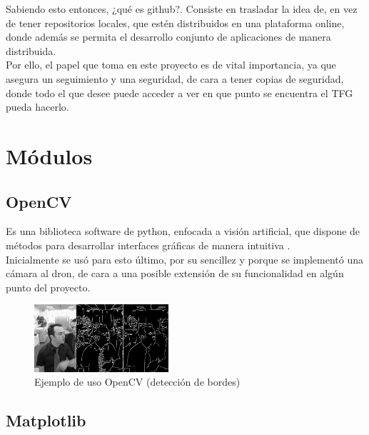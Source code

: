 Sabiendo esto entonces, ¿qué es github?. Consiste en trasladar la idea de, en vez de tener repositorios locales, que estén distribuidos en una plataforma online, donde además se permita el desarrollo conjunto de aplicaciones de manera distribuida.\\

Por ello, el papel que toma en este proyecto es de vital importancia, ya que asegura un seguimiento y una seguridad, de cara a tener copias de seguridad, donde todo el que desee puede acceder a ver en que punto se encuentra el \ac{TFG} pueda hacerlo.\\

\section{Módulos}
\label{sec:modulos}

\subsection{OpenCV}
\label{subsec:opencv}

Es una biblioteca software de python, enfocada a visión artificial, que dispone de métodos para desarrollar interfaces gráficas de manera intuitiva \cite{opencv-def}.\\

Inicialmente se usó para esto último, por su sencillez y porque se implementó una cámara al dron, de cara a una posible extensión de su funcionalidad en algún punto del proyecto.\\

\begin{figure} [H]
	\begin{center}
	\includegraphics[height=2.5cm]{imagenes/cap3/5_opencv_example.png}
	\end{center}
	\caption[Ejemplo de uso OpenCV (detección de bordes)]{Ejemplo de uso OpenCV (detección de bordes)}
	\label{fig:opencv}
\end{figure}

\subsection{Matplotlib}
\label{subsec:matplotlib}

